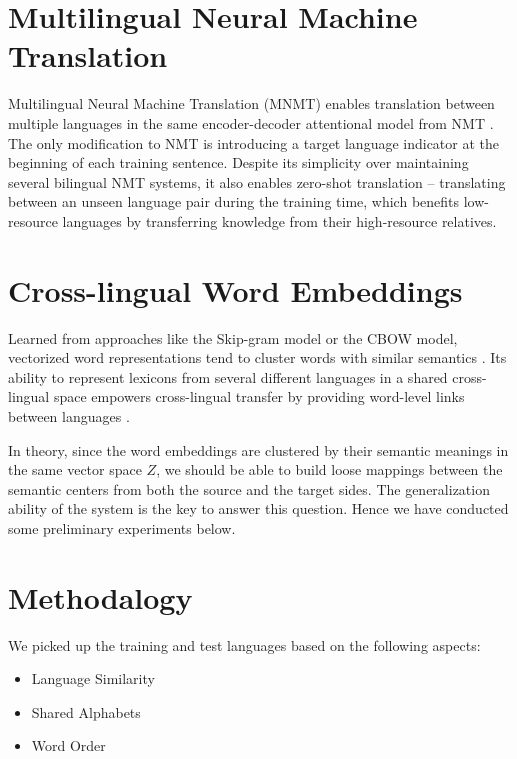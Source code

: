 \documentclass[11pt,a4paper]{article}
\begin{document}
\section{Multilingual Neural Machine Translation}

Multilingual Neural Machine Translation (MNMT) enables translation between multiple languages in the same encoder-decoder attentional model from NMT \cite{Johnson:2016aa, Ha:2016aa}. The only modification to NMT is introducing a target language indicator at the beginning of each training sentence. Despite its simplicity over maintaining several bilingual NMT systems, it also enables zero-shot translation -- translating between an unseen language pair during the training time, which benefits low-resource languages by transferring knowledge from their high-resource relatives.

\section{Cross-lingual Word Embeddings}

Learned from approaches like the Skip-gram model or the CBOW model, vectorized word representations tend to cluster words with similar semantics \cite{Mikolov:2013ac}. Its ability to represent lexicons from several different languages in a shared cross-lingual space empowers cross-lingual transfer by providing word-level links between languages \cite{Ruder:2019aa}. 

In theory, since the word embeddings are clustered by their semantic meanings in the same vector space $Z$, we should be able to build loose mappings between the semantic centers from both the source and the target sides. The generalization ability of the system is the key to answer this question. Hence we have conducted some preliminary experiments below.

\section{Methodalogy}

We picked up the training and test languages based on the following aspects:

\begin{itemize}
 \item Language Similarity
 \item Shared Alphabets
 \item Word Order
\end{itemize}
\end{document}

